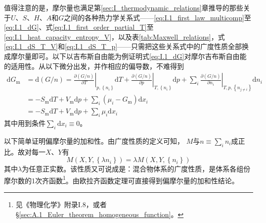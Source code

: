 \documentclass[main.tex]{subfiles}
\begin{document}
值得注意的是，摩尔量也满足第\ref{sec:I_thermodynamic_relations}章推导的那些关于$U$、$S$、$H$、$A$和$G$之间的各种热力学关系式——\eqref{eq:I.1_first_law_multicomp}至\eqref{eq:I.1_dG}、式\eqref{eq:I.1_first_order_partial_T}至\eqref{eq:I.1_heat_capacity_entropy_V}，以及表\ref{tab:Maxwell_relations}，式\eqref{eq:I.1_dS_T_V}和\eqref{eq:I.1_dS_T_p}——只需把这些关系式中的广度性质全部换成摩尔量即可。以下以吉布斯自由能为例证明式\eqref{eq:I.1_dG}对摩尔吉布斯自由能的适用性。从以下微分出发，并作相应的偏导数，不难得到
\begin{align*}
  \mathrm{d}G_\text{m} & =\mathrm{d}\left(G/n\right)=\left.\frac{\partial\left(G/n\right)}{\partial T}\right|_{p,\left\{n_i\right\}}\mathrm{d}T+\left.\frac{\partial\left(G/n\right)}{\partial p}\right|_{T,\left\{n_i\right\}}\mathrm{d}p+\sum_i\left.\frac{\partial\left(G/n\right)}{\partial n_i}\right|_{T,p,\left\{n_{j\neq i}\right\}}\mathrm{d}n_i \\
                       & =-S_\text{m}\mathrm{d}T+V_\text{m}\mathrm{d}p+\sum_i\left(\mu_i-G_\text{m}\right)\mathrm{d}x_i                                                                                                                                                                                                                                   \\
                       & =-S_\text{m}\mathrm{d}T+V_\text{m}\mathrm{d}p+\sum_i\mu_i\mathrm{d}x_i
\end{align*}
其中用到条件$\sum_i\mathrm{d}x_i\equiv 0$。

以下简单证明偏摩尔量的加和性。由广度性质的定义可知， $M$与$n\equiv\sum_in_i$成正比。故对每一$X$、$Y$有
\[M\left(X,Y,\left\{\lambda n_i\right\}\right)=\lambda M\left(X,Y,\left\{n_i\right\}\right)\]
其中$\lambda$为任意正实数。该性质又可说成是：混合物体系的广度性质，是体系各组份摩尔数的1次齐函数\footnote{见《物理化学》附录I.8，或者\S\ref{sec:A.1_Euler_theorem_homogeneous_function}。}。由欧拉齐函数定理可直接得到偏摩尔量的加和性结论。
\end{document}
